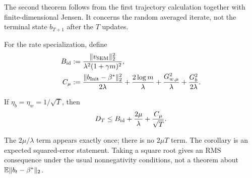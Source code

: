 The second theorem follows from the first trajectory calculation together
with finite-dimensional Jensen.  It concerns the random averaged iterate, not
the terminal state $b_{T+1}$ after the $T$ updates.

For the rate specialization, define
\begin{align}
  B_{\rm id}
  &:=\frac{\|v_{\rm SEM}\|_2^2}
          {\lambda^2(1+\gamma m)^2},
  \label{eq:identification-bias}\\
  C_\mu
  &:=\frac{\|b_{\rm Init}-\beta^*\|_2^2}{2\lambda}
     +\frac{2\log m}{\lambda}
     +\frac{G_{w,\mu}^2}{\lambda}
     +\frac{G_b^2}{2\lambda}.
  \label{eq:penalized-rate-constant}
\end{align}

\begin{corollary}
\label{cor:penalized-inv-sqrt}
If $\eta_b=\eta_w=1/\sqrt T$, then
\begin{equation}
  D_T
  \le B_{\rm id}+\frac{2\mu}{\lambda}+\frac{C_\mu}{\sqrt T}.
  \label{eq:penalized-inv-sqrt-rate}
\end{equation}
\end{corollary}

The $2\mu/\lambda$ term appears exactly once; there is no $2\mu T$ term.  The
corollary is an expected squared-error statement.  Taking a square root gives
an RMS consequence under the usual nonnegativity conditions, not a theorem
about $\mathbb{E}\|b_t-\beta^*\|_2$.
